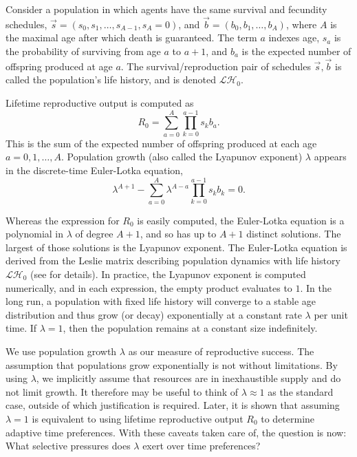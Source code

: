 \documentclass[titlepage, hidelinks, 12pt]{article}
\theoremstyle{plain}
\theoremstyle{remark}
\theoremstyle{definition}
\newcommand{\LH}{\mathcal{LH}}
\begin{document}
Consider a population in which agents have the same survival and fecundity
schedules, $\vec{s} = (s_0, s_1, \ldots, s_{A-1}, s_A = 0)$, and $\vec{b} = (b_0, b_1, \ldots, b_A)$, where $A$ is the maximal age after
which death is guaranteed. The term $a$ indexes age, $s_a$ is the probability of surviving from age $a$ to $a+1$, and $b_a$ is the expected
number of offspring produced at age $a$. 
The survival/reproduction pair of schedules $\vec{s}, \vec{b}$
is called the population's life history, and is denoted $\LH_0$. 

Lifetime reproductive output is computed as
\begin{equation}
    R_0 = \sum\limits_{a = 0}^A \prod\limits_{k = 0}^{a-1} s_k b_a.
    \label{eqn:output}
\end{equation}
This is the sum of the expected number of offspring produced at each age $a= 0, 1, \ldots, A$. 
Population growth (also called the Lyapunov exponent) $\lambda$
appears in the discrete-time Euler-Lotka equation,
\begin{equation}
    \lambda^{A+1} - \sum\limits_{a = 0}^A \lambda^{A-a} \prod\limits_{k = 0}^{a-1}s_k b_k= 0.
    \label{eqn:euler-lotka}
\end{equation}


Whereas the expression for $R_0$ is easily computed, the Euler-Lotka equation
is a polynomial in $\lambda$ of degree $A+1$, and so has up to $A+1$ distinct solutions. The largest of those solutions is the Lyapunov exponent.
The Euler-Lotka equation is derived from the Leslie matrix describing population dynamics with life history $\LH_0$ (see \cite{stearns92}
for details). In practice, the Lyapunov exponent is computed numerically, and in each expression, the empty product evaluates to $1$. 
In the long run, a population with fixed life history will converge to a stable age distribution and
thus grow (or decay) 
exponentially at a constant rate $\lambda$ per unit time. If $\lambda = 1$, then the population remains at a constant size indefinitely.

We use population growth $\lambda$ as our measure of reproductive success. The assumption that populations grow exponentially is not without limitations.
By using $\lambda$, we implicitly assume that resources are in inexhaustible supply 
and do not limit growth. It therefore
may be useful to think of $\lambda \approx 1$ as the standard case, outside of which justification is required. Later, it is shown that assuming
$\lambda = 1$ is equivalent to using lifetime reproductive output $R_0$ to determine adaptive time preferences.
With these caveats taken care of, the question is now: What selective pressures does $\lambda$ 
exert over time preferences?
\end{document}
